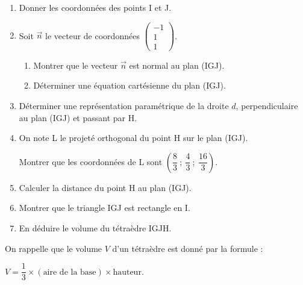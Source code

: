 \documentclass[10pt]{article}
\providecommand{\vect}[1]{\overrightarrow{#1}}
\begin{document}
\begin{enumerate}
\item Donner les coordonnées des points I et J.
\item Soit $\vect{n}$ le vecteur de coordonnées $\begin{pmatrix}-1\\1\\1\end{pmatrix}$.
	\begin{enumerate}
		\item Montrer que le vecteur $\vect{n}$ est normal au plan (IGJ).
		\item Déterminer une équation cartésienne du plan (IGJ).
	\end{enumerate}	
\item Déterminer une représentation paramétrique de la droite $d$, perpendiculaire au
plan (IGJ) et passant par H.
\item On note L le projeté orthogonal du point H sur le plan (IGJ).

Montrer que les coordonnées de L sont $\left(\dfrac83~;~ \dfrac43~;~\dfrac{16}{3}\right)$.
\item Calculer la distance du point H au plan (IGJ).
\item Montrer que le triangle IGJ est rectangle en I.
\item En déduire le volume du tétraèdre IGJH.
\end{enumerate}

\begin{center}
On rappelle que le volume $V$ d'un tétraèdre est donné par la formule :

$V = \dfrac13 \times (\text{aire de la base}) \times  \text{hauteur}.$
\end{center}

\bigskip
\end{document}
